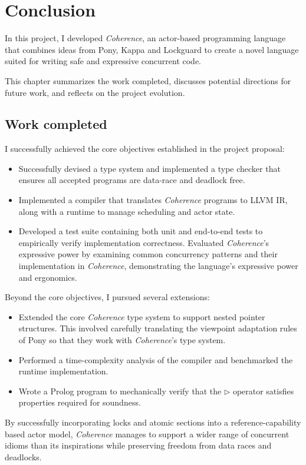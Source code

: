 \chapter{Conclusion}
In this project, I developed \textit{Coherence}, an actor-based programming language that combines ideas from Pony, Kappa and Lockguard to create a novel language suited for writing safe and expressive concurrent code.

This chapter summarizes the work completed, discusses potential directions for future work, and reflects on the project evolution.

\section{Work completed}
I successfully achieved the core objectives established in the project proposal:
\begin{itemize}
  \item Successfully devised a type system and implemented a type checker that ensures all accepted programs are data-race and deadlock free. 
  \item Implemented a compiler that translates \textit{Coherence} programs to LLVM IR, along with a runtime to manage scheduling and actor state.
  \item Developed a test suite containing both unit and end-to-end tests to empirically verify implementation correctness. Evaluated \textit{Coherence}'s expressive power by examining common concurrency patterns and their implementation in \textit{Coherence}, demonstrating the language's expressive power and ergonomics.
\end{itemize}
Beyond the core objectives, I pursued several extensions:
\begin{itemize}
  \item Extended the core \textit{Coherence} type system to support nested pointer structures. This involved carefully translating the viewpoint adaptation rules of Pony so that they work with \textit{Coherence}'s type system.
  \item Performed a time-complexity analysis of the compiler and benchmarked the runtime implementation.
  \item Wrote a Prolog program to mechanically verify that the $\triangleright$ operator satisfies properties required for soundness.
\end{itemize}

By successfully incorporating locks and atomic sections into a reference-capability based actor model, \textit{Coherence} manages to support a wider range of concurrent idioms than its inspirations while preserving freedom from data races and deadlocks.

